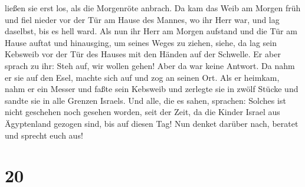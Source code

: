 ließen sie erst los, als die Morgenröte anbrach.  Da kam
das Weib am Morgen früh und fiel nieder vor der Tür am Hause des Mannes,
wo ihr Herr war, und lag daselbst, bis es hell ward.  Als
nun ihr Herr am Morgen aufstand und die Tür am Hause auftat und
hinausging, um seines Weges zu ziehen, siehe, da lag sein Kebsweib vor
der Tür des Hauses mit den Händen auf der Schwelle.  Er
aber sprach zu ihr: Steh auf, wir wollen gehen! Aber da war keine
Antwort. Da nahm er sie auf den Esel, machte sich auf und zog an seinen
Ort.  Als er heimkam, nahm er ein Messer und faßte sein
Kebsweib und zerlegte sie in zwölf Stücke und sandte sie in alle Grenzen
Israels.  Und alle, die es sahen, sprachen: Solches ist
nicht geschehen noch gesehen worden, seit der Zeit, da die Kinder Israel
aus Ägyptenland gezogen sind, bis auf diesen Tag! Nun denket darüber
nach, beratet und sprecht euch aus!

\hypertarget{section-19}{%
\section{20}\label{section-19}}


